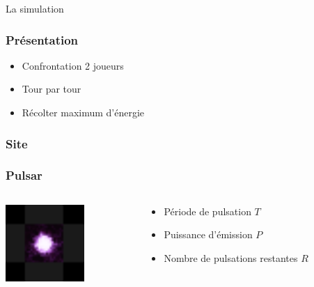 \documentclass{beamer}
\begin{document}
\begin{frame}
    La simulation
\end{frame}

\begin{frame}
	\frametitle{Présentation}
	\begin{itemize}
        \item Confrontation 2 joueurs
        \item Tour par tour
        \item Récolter maximum d'énergie
	\end{itemize}
\end{frame}

\begin{frame}
	\frametitle{Site}
\end{frame}

\begin{frame}
	\frametitle{Pulsar}
    \begin{columns}[T]
        \begin{column}{.3\textwidth}
            \includegraphics[width=3cm]{pictures/pulsar}
        \end{column}
        \begin{column}{.7\textwidth}
            \begin{itemize}
                \item Période de pulsation $T$
                \item Puissance d'émission $P$
                \item Nombre de pulsations restantes $R$
            \end{itemize}
        \end{column}
    \end{columns}
\end{frame}
\end{document}
